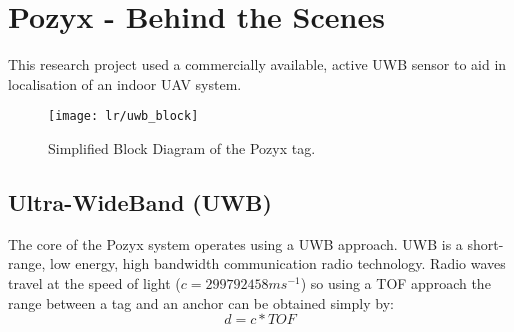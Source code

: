 \section{Pozyx - Behind the Scenes}\label{sec:pozyx---behind-the-scenes}
This research project used a commercially available, active UWB sensor to aid in localisation of an indoor UAV system.
\begin{figure}[h!]
    \centering
    \texttt{[image: lr/uwb\_block]}
    \caption{Simplified Block Diagram of the Pozyx tag.}
\end{figure}
\subsection{Ultra-WideBand (UWB)}
The core of the Pozyx system operates using a UWB approach.
UWB is a short-range, low energy, high bandwidth communication radio technology.
Radio waves travel at the speed of light ($c=299792458ms^{-1}$) so using a TOF approach the range between a tag and an anchor can be obtained simply by:
\[
    d = c*TOF
\]

